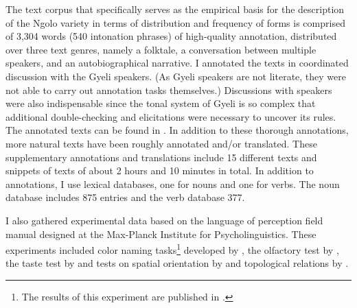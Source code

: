 The text corpus that specifically serves as the empirical basis for the description of the Ngolo variety in terms of distribution and frequency of forms is comprised of 3,304 words (540 intonation phrases) of high-quality annotation, distributed over three text genres, namely a folktale, a conversation between multiple speakers, and an autobiographical narrative. I annotated the texts in coordinated discussion with the Gyeli speakers. (As Gyeli speakers are not literate, they were not able to carry out annotation tasks themselves.) Discussions with speakers were also indispensable since the tonal system of Gyeli is so complex that additional double-checking and elicitations were necessary to uncover its rules. The annotated texts can be found in  . In addition to these thorough annotations, more natural texts have been roughly annotated and/or translated. These supplementary annotations and translations include 15 different texts and snippets of texts of about 2 hours and 10 minutes in total. In addition to annotations, I use lexical databases, one for nouns and one for verbs. The noun database includes 875 entries and the verb database 377.

I also gathered experimental data based on the language of perception field manual designed at the Max-Planck Institute for Psycholinguistics. These experiments included color naming tasks\footnote{The results of this experiment are published in \citet{grimm2014}.} developed by \citet{majid2007a}, the olfactory test by \citet{majid2007b}, the taste test by \citet{senft2007} and tests on spatial orientation by \citet{levinson93} and topological relations by \citet{bowerman92}. 

